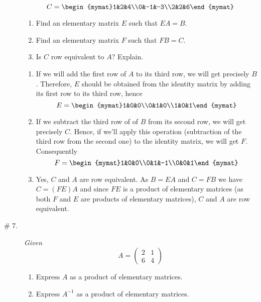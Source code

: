 \documentclass[8pt]{article} %
\begin{document}
\begin{description}
{{\[		C=\begin{mymat}1&2&4\\0&-1&-3\\2&2&6\end{mymat}\]
		\begin{enumerate}[label=(\alph*)]
			\item Find an elementary matrix $E$ such that $EA=B$.
			\item Find an elementary matrix $F$ such that $FB=C$.
			\item Is $C$ row equivalent to $A$? Explain.
		\end{enumerate}
		}
		\begin{enumerate}[label=(\alph*)]
			\item If we will add the first row of $A$ to its third row, we will get precisely $B$. Therefore, $E$ should be obtained
				from the identity matrix by adding its first row to its third row, hence
				\[E=\begin{mymat}1&0&0\\0&1&0\\1&0&1\end{mymat}\]
			\item If we subtract the third row of of $B$ from its second row, we will get precisely $C$. Hence,
				if we'll apply this operation (subtraction of the third row from the second one) to the identity 
				matrix, we will get $F$. Consequently
				\[F=\begin{mymat}1&0&0\\0&1&-1\\0&0&1\end{mymat}\]
			\item Yes, $C$ and $A$ are row equivalent. As $B=EA$ and $C=FB$ we have $C=(FE)A$ and since $FE$ is a product
				of elementary matrices (as both $F$ and $E$ are products of elementary matrices), $C$ and $A$ are row equivalent.
		\end{enumerate}
		}
	\item[\# 7.]{{\it Given \[A=\begin{pmatrix}2&1\\6&4\end{pmatrix}\]
			\begin{enumerate}[label=(\alph*)]
				\item Express $A$ as a product of elementary matrices.
				\item Express $A^{-1}$ as a product of elementary matrices.
			\end{enumerate}
		}
		\begin{enumerate}[label=(\alph*)]

\end{enumerate}}
\end{description}
\end{document}
